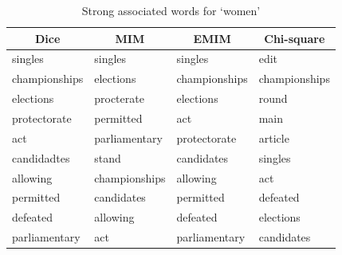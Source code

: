 \documentclass[letterpaper,11pt]{article}
\begin{document}
\begin{table}[H]
\centering
\begin{tabular}{|l|l|l|l|}
\hline
\multicolumn{1}{|c|}{\textbf{Dice}} & \multicolumn{1}{c|}{\textbf{MIM}} & \multicolumn{1}{c|}{\textbf{EMIM}} & \multicolumn{1}{c|}{\textbf{Chi-square}} \\ \hline
singles & singles & singles & edit \\ \hline
championships & elections & championships & championships \\ \hline
elections & procterate & elections & round \\ \hline
protectorate & permitted & act & main \\ \hline
act & parliamentary & protectorate & article \\ \hline
candidadtes & stand & candidates & singles \\ \hline
allowing & championships & allowing & act \\ \hline
permitted & candidates & permitted & defeated \\ \hline
defeated & allowing & defeated & elections \\ \hline
parliamentary & act & parliamentary & candidates \\ \hline
\end{tabular}
\caption{Strong associated words for `women'}
\label{tab:women}
\end{table}

\medskip


\end{document}
